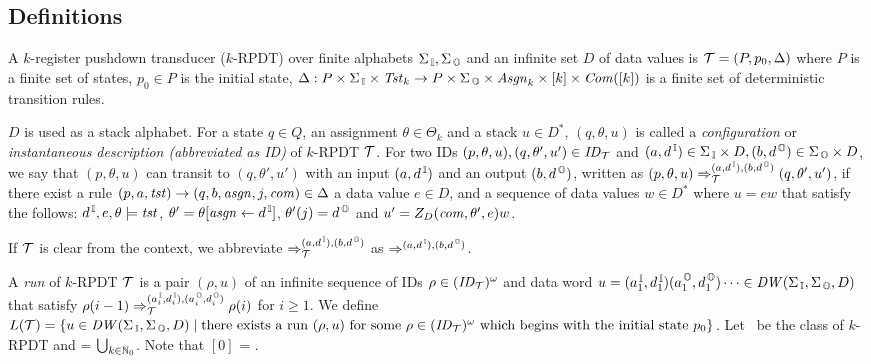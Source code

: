 \subsection{Definitions}
\begin{definition}
A $k$-{register pushdown transducer} ($k$-RPDT) over finite alphabets $\Sigma_{\, \mathbb{I}},\Sigma_{\, \mathbb{O}}$ and an infinite set $D$ of data values is
${\cal T}=(P, p_0, \Delta)$ where
$P$ is a finite set of states,
$p_0\in P$ is the initial state,
$\Delta: P\times\Sigma_{\, \mathbb{I}}\times\mathit{Tst}_k \to P\times\Sigma_{\, \mathbb{O}}\times \mathit{Asgn}_k \times [k]\times \mathit{Com}([k])$ is a finite set of deterministic transition rules.
\end{definition}
$D$ is used as a stack alphabet.
For a state $q\in Q$, an assignment $\theta\in\Theta_k$ and a stack $u\in D^*$,
$(q,\theta,u)$ is called
a {\em configuration} or {\em instantaneous description (abbreviated as ID)} of $k$-RPDT ${\cal T}$.
For two IDs $(p, \theta, u), (q, \theta', u')\in \mathit{ID}_{\cal T}$ and $(a,d^{\, \mathbb{I}})\in\Sigma_{\, \mathbb{I}}\times D, (b,d^{\, \mathbb{O}})\in \Sigma_{\, \mathbb{O}}\times D$,
we say that $(p, \theta, u)$ can transit to $(q, \theta', u')$ with an input $(a,d^{\, \mathbb{I}})$ and an output $(b,d^{\, \mathbb{O}})$, written as $(p, \theta, u) \Rightarrow_{{\cal T}}^{(a,d^{\, \mathbb{I}}), (b,d^{\, \mathbb{O}})}(q, \theta', u')$, if there exist a rule $(p, a, \mathit{tst}) \to (q, b, \mathit{asgn}, j, \mathit{com}) \in \Delta$
a data value $e\in D$, and a sequence of data values $w\in D^*$ where $u=ew$
that satisfy the follows:
$d^{\, \mathbb{I}}, e, \theta\models\mathit{tst}$, $\theta' = \theta[\mathit{asgn}\leftarrow d^{\, \mathbb{I}}]$, $\theta'(j) = d^{\, \mathbb{O}}$ and $u'= Z_D(\mathit{com},\theta',e)w$.

If ${\cal T}$ is clear from the context,
we abbreviate
$\Rightarrow_{{\cal T}}^{(a,d^{\, \mathbb{I}}), (b,d^{\, \mathbb{O}})}$ as $\Rightarrow^{(a,d^{\, \mathbb{I}}), (b,d^{\, \mathbb{O}})}$.

A {\em run} of $k$-RPDT ${\cal T}$ is a pair $(\rho, u)$ of an infinite sequence of IDs $\rho\in (\mathit{ID}_{\cal T})^\omega$ and data word $u = (a^{\, \mathbb{I}}_1,d^{\, \mathbb{I}}_1) (a^{\, \mathbb{O}}_1,d^{\, \mathbb{O}}_1) \cdots \in \mathit{DW}(\Sigma_{\, \mathbb{I}},\Sigma_{\, \mathbb{O}},D)$ that satisfy
$\rho(i-1)\Rightarrow_{\cal T}^{(a^{\, \mathbb{I}}_i,d^{\, \mathbb{I}}_i), (a^{\, \mathbb{O}}_i,d^{\, \mathbb{O}}_i)}\rho(i)$ for $i\geq 1$.
We define $L({\cal T}) = \{u\in \mathit{DW}(\Sigma_{\, \mathbb{I}},\Sigma_{\, \mathbb{O}},D) \mid
\text{there exists a run $(\rho, u)$ for some $\rho\in(\mathit{ID}_{\cal T})^\omega$ which begins with the initial state $p_0$}\}$.
Let \RPDTk\ be the class of $k$-RPDT and \RPDT = $\bigcup_{k\in\mathbb{N}_0}$\RPDTk.
Note that \RPDT$[0]$ = \PDT.

